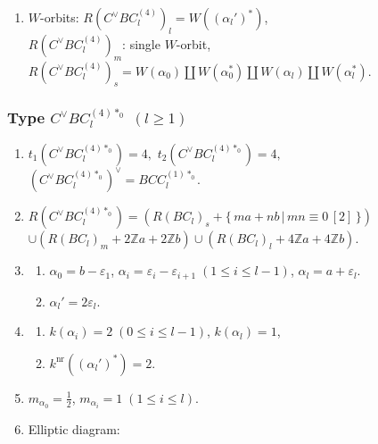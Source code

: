 \documentclass[11pt]{amsart}
\newcommand{\Z}{\mathbb{Z}}
\newcommand{\nr}{\mathrm{nr}}
\newcommand{\vep}{\varepsilon}
\begin{document}
{\begin{enumerate}
\begin{center}
{}
\end{center}
\item $W$-orbits:  $R(C^\vee BC_l^{(4)})_l=W((\alpha_l')^\ast)$, \\
\phantom{$W$-orbits:}  $R(C^\vee BC_l^{(4)})_m$: single $W$-orbit, \\
\phantom{$W$-orbits:} 
$R(C^\vee BC_l^{(4)})_s=W(\alpha_0) \amalg W(\alpha_0^\ast)
\amalg W(\alpha_l) \amalg W(\alpha_l^\ast)$.
\end{enumerate}

\subsubsection{Type $C^\vee BC_l^{(4)\ast_0}$ $(l\geq 1)$}\label{data:CBC-7}
\begin{enumerate}
\item $t_1(C^\vee BC_l^{(4)\ast_{0}})=4,$ \quad $t_2(C^\vee BC_l^{(4)\ast_{0}})=4,$ \quad $(C^\vee BC_l^{(4)\ast_{0}})^\vee = BCC_l^{(1)\ast_{0}}.$
\item $R(C^\vee BC_l^{(4)\ast_0})=(R(BC_l)_s+\{\, ma+nb\, \vert\, mn \equiv 0\, [2]\, \})$ \\
 $\cup (R(BC_l)_m+2\Z a+2\Z b) \cup (R(BC_l)_l+4\Z a+4\Z b)$. 
\item 
\begin{enumerate}
\item[i)] $\alpha_0=b-\vep_1$, $\alpha_i=\vep_i-\vep_{i+1}\; 
(1\leq i\leq l-1)$, $\alpha_l=a+\vep_l$. 
\item[ii)] $\alpha_l'=2\vep_l$.
\end{enumerate}
\item 
\begin{enumerate}
\item[i)] $k(\alpha_i)=2\; (0\leq i \leq l-1)$, \; $k(\alpha_l)=1$, 
\item[ii)] $k^{\nr}((\alpha_l')^\ast)=2$. 
\end{enumerate}
\item $m_{\alpha_0}=\frac{1}{2}$, \; $m_{\alpha_i}=1\; (1\leq i \leq l)$.
\item Elliptic diagram:





\end{enumerate}}
\end{document}
